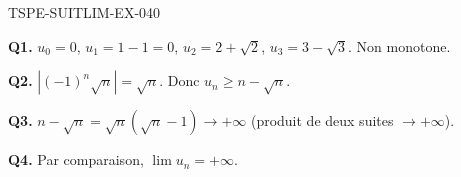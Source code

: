 \begin{corrige}{TSPE-SUITLIM-EX-040}

\textbf{Q1.} $u_0=0$, $u_1=1-1=0$, $u_2=2+\sqrt{2}$, $u_3=3-\sqrt{3}$. Non monotone.

\textbf{Q2.} $|(-1)^n\sqrt{n}| = \sqrt{n}$. Donc $u_n \geq n - \sqrt{n}$.

\textbf{Q3.} $n-\sqrt{n} = \sqrt{n}(\sqrt{n}-1) \to +\infty$ (produit de deux suites $\to +\infty$).

\textbf{Q4.} Par comparaison, $\boxed{\lim u_n = +\infty}$.

\end{corrige}
